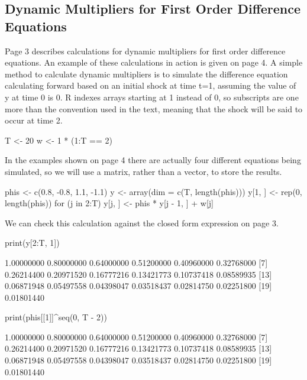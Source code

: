 \documentclass[a4paper]{article}
\begin{document}
\subsection{Dynamic Multipliers for First Order Difference Equations}
Page 3 describes calculations for dynamic multipliers for first order difference equations.  An example of these
calculations in action is given on page 4.  A simple method to calculate dynamic multipliers is to simulate
the difference equation calculating forward based on an initial shock at time t=1, assuming the value of y at time 0 is 0.
R indexes arrays starting at 1 instead of 0, so subscripts are one more than the convention used in the text, meaning that
the shock will be said to occur at time 2.
\begin{Schunk}
\begin{Sinput}
 T <- 20
 w <- 1 * (1:T == 2)
\end{Sinput}
\end{Schunk}
In the examples shown on page 4 there are actually four different equations being simulated,
so we will use a matrix, rather than a vector, to store the results.
\begin{Schunk}
\begin{Sinput}
 phis <- c(0.8, -0.8, 1.1, -1.1)
 y <- array(dim = c(T, length(phis)))
 y[1, ] <- rep(0, length(phis))
 for (j in 2:T) y[j, ] <- phis * y[j - 1, ] + w[j]
\end{Sinput}
\end{Schunk}
We can check this calculation against the closed form expression on page 3.
\begin{Schunk}
\begin{Sinput}
 print(y[2:T, 1])
\end{Sinput}
\begin{Soutput}
 [1] 1.00000000 0.80000000 0.64000000 0.51200000 0.40960000 0.32768000
 [7] 0.26214400 0.20971520 0.16777216 0.13421773 0.10737418 0.08589935
[13] 0.06871948 0.05497558 0.04398047 0.03518437 0.02814750 0.02251800
[19] 0.01801440
\end{Soutput}
\begin{Sinput}
 print(phis[[1]]^seq(0, T - 2))
\end{Sinput}
\begin{Soutput}
 [1] 1.00000000 0.80000000 0.64000000 0.51200000 0.40960000 0.32768000
 [7] 0.26214400 0.20971520 0.16777216 0.13421773 0.10737418 0.08589935
[13] 0.06871948 0.05497558 0.04398047 0.03518437 0.02814750 0.02251800
[19] 0.01801440
\end{Soutput}
\end{Schunk}
\end{document}
